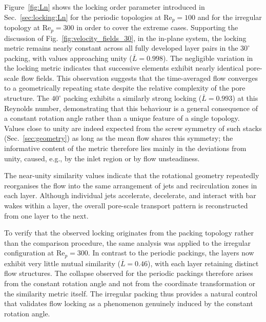 Figure~\ref{fig:Ln} shows the locking order parameter introduced in Sec.~\ref{sec:locking:Ln} for the periodic topologies at Re$_p = 100$ and for the irregular topology at Re$_p = 300$ in order to cover the extreme cases. Supporting the discussion of Fig.~\ref{fig:velocity_fields_30}, in the in-plane system, the locking metric remains nearly constant across all fully developed layer pairs in the $30^\circ$ packing, with values approaching unity ($\overline{L}=0.998$). The negligible variation in the locking metric indicates that successive elements exhibit nearly identical pore-scale flow fields. This observation suggests that the time-averaged flow converges to a geometrically repeating state despite the relative complexity of the pore structure. The $40^\circ$ packing exhibits a similarly strong locking ($\overline{L}=0.993$) at this Reynolds number, demonstrating that this behaviour is a general consequence of a constant rotation angle rather than a unique feature of a single topology. Values close to unity are indeed expected from the screw symmetry of such stacks (Sec.~\ref{sec:geometry}) as long as the mean flow shares this symmetry; the informative content of the metric therefore lies mainly in the deviations from unity, caused, e.g., by the inlet region or by flow unsteadiness.

The near-unity similarity values indicate that the rotational geometry repeatedly reorganises the flow into the same arrangement of jets and recirculation zones in each layer. Although individual jets accelerate, decelerate, and interact with bar wakes within a layer, the overall pore-scale transport pattern is reconstructed from one layer to the next.

To verify that the observed locking originates from the packing topology rather than the comparison procedure, the same analysis was applied to the irregular configuration at Re$_p=300$. In contrast to the periodic packings, the layers now exhibit very little mutual similarity ($\overline{L}=0.46$), with each layer retaining distinct flow structures. The collapse observed for the periodic packings therefore arises from the constant rotation angle and not from the coordinate transformation or the similarity metric itself. The irregular packing thus provides a natural control that validates flow locking as a phenomenon genuinely induced by the constant rotation angle.

